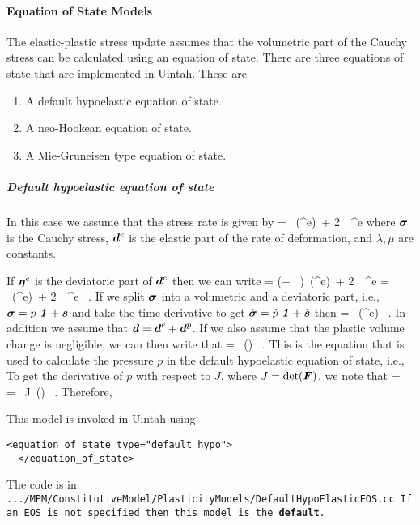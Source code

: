 \paragraph{Equation of State Models}
The elastic-plastic stress update assumes that the volumetric part of the
Cauchy stress can be calculated using an equation of state.  There are
three equations of state that are implemented in Uintah.  These are
\begin{enumerate}
    \item A default hypoelastic equation of state.
    \item A neo-Hookean equation of state.
    \item A Mie-Gruneisen type equation of state.
\end{enumerate}

\subparagraph{Default hypoelastic equation of state}
In this case we assume that the stress rate is given by
\Beq
    \dot{\Bsig} = \lambda~\Tr(\Bd^e)~\Bone + 2~\mu~\Bd^e
\Eeq
where $\Bsig$ is the Cauchy stress, $\Bd^e$ is the elastic part of
the rate of deformation, and $\lambda, \mu$ are constants.

If $\Beta^e$ is the deviatoric part of $\Bd^e$ then we can write
\Beq
    \dot{\Bsig} = \left(\lambda + ~\mu\right)~\Tr(\Bd^e)~\Bone +
        2~\mu~\Beta^e = \kappa~\Tr(\Bd^e)~\Bone + 2~\mu~\Beta^e ~.
\Eeq
If we split $\Bsig$ into a volumetric and a deviatoric part, i.e.,
$\Bsig = p~\Bone + \Bs$ and take the time derivative to get
$\dot{\Bsig} = \dot{p}~\Bone + \dot{\Bs}$ then
\Beq
     = \kappa~\Tr(\Bd^e) ~.
\Eeq
In addition we assume that $\Bd = \Bd^e + \Bd^p$.  If we also assume that
the plastic volume change is negligible, we can then write that
\Beq
     = \kappa~\Tr(\Bd) ~.
\Eeq
This is the equation that is used to calculate the pressure $p$ in the
default hypoelastic equation of state, i.e.,
\Beq
\Eeq
To get the derivative of $p$ with respect to $J$, where $J = \det(\BF)$,
we note that
\Beq
     = ~ = ~J~\Tr(\Bd) ~.
\Eeq
Therefore,
\Beq
\Eeq

This model is invoked in Uintah using
\begin{Verbatim}[fontsize=\footnotesize]
  <equation_of_state type="default_hypo">
  </equation_of_state>
\end{Verbatim}
The code is in \tt.../MPM/ConstitutiveModel/PlasticityModels/DefaultHypoElasticEOS.cc \normalfont
If an EOS is not specified then this model is the {\bf default}.

